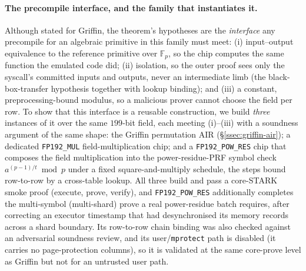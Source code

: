 \paragraph{The precompile interface, and the family that instantiates it.}
Although stated for Griffin, the theorem's hypotheses are the \emph{interface} any precompile for an algebraic primitive in this family must meet: (i) input--output equivalence to the reference primitive over $\mathbb{F}_p$, so the chip computes the same function the emulated code did; (ii) isolation, so the outer proof sees only the syscall's committed inputs and outputs, never an intermediate limb (the black-box-transfer hypothesis together with lookup binding); and (iii) a constant, preprocessing-bound modulus, so a malicious prover cannot choose the field per row. To show that this interface is a reusable construction, we build \emph{three} instances of it over the same $199$-bit field, each meeting (i)--(iii) with a soundness argument of the same shape: the Griffin permutation AIR (\S\ref{ssec:griffin-air}); a dedicated \texttt{FP192\_MUL} field-multiplication chip; and a \texttt{FP192\_POW\_RES} chip that composes the field multiplication into the power-residue-PRF symbol check $a^{(p-1)/t}\bmod p$ under a fixed square-and-multiply schedule, the steps bound row-to-row by a cross-table lookup. All three build and pass a core-STARK smoke proof (execute, prove, verify), and \texttt{FP192\_POW\_RES} additionally completes the multi-symbol (multi-shard) prove a real power-residue batch requires, after correcting an executor timestamp that had desynchronised its memory records across a shard boundary. Its row-to-row chain binding was also checked against an adversarial soundness review, and its user/\texttt{mprotect} path is disabled (it carries no page-protection columns), so it is validated at the same core-prove level as Griffin but not for an untrusted user path.

